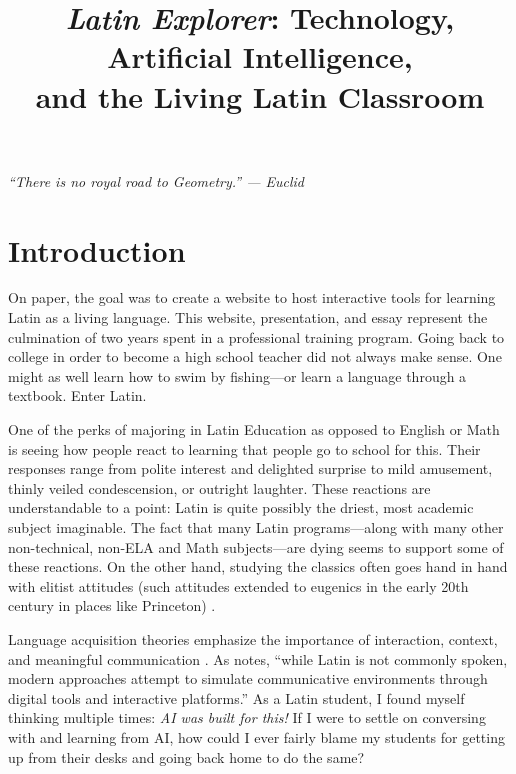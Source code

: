\documentclass[11pt, a4paper]{article}
\title{\textit{Latin Explorer}: Technology, Artificial Intelligence,\\
       and the Living Latin Classroom}
\author{}
\date{}
\begin{document}

\maketitle
\thispagestyle{plain}

\begin{center}
\itshape ``There is no royal road to Geometry.'' \upshape --- Euclid
\end{center}

\vspace{0.5em}

\section{Introduction}

On paper, the goal was to create a website to host interactive tools for
learning Latin as a living language. This website, presentation, and essay
represent the culmination of two years spent in a professional training
program. Going back to college in order to become a high school teacher did
not always make sense. One might as well learn how to swim by fishing---or
learn a language through a textbook. Enter Latin.

One of the perks of majoring in Latin Education as opposed to English or
Math is seeing how people react to learning that people go to school for
this. Their responses range from polite interest and delighted surprise to
mild amusement, thinly veiled condescension, or outright laughter. These
reactions are understandable to a point: Latin is quite possibly the driest,
most academic subject imaginable. The fact that many Latin programs---along
with many other non-technical, non-ELA and Math subjects---are dying seems
to support some of these reactions. On the other hand, studying the classics
often goes hand in hand with elitist attitudes (such attitudes extended to
eugenics in the early 20th century in places like Princeton)
\autocite[see, e.g.,][]{Stray1998}.

Language acquisition theories emphasize the importance of interaction,
context, and meaningful communication \autocite{Krashen1982}. As
\textcite{Yuldasheva2026} notes, ``while Latin is not commonly spoken,
modern approaches attempt to simulate communicative environments through
digital tools and interactive platforms.'' As a Latin student, I found
myself thinking multiple times: \textit{AI was built for this!} If I were
to settle on conversing with and learning from AI, how could I ever fairly
blame my students for getting up from their desks and going back home to do
the same?
\end{document}
